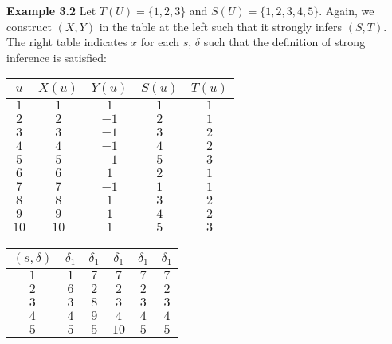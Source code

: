 \documentclass[11pt]{article}
\begin{document}
  
 \bigbreak
 \bigbreak 
 \textbf{Example 3.2} \quad Let $ T(U) = \{1, 2, 3\} $ and $ S(U) = \{1, 2, 3, 4, 5\} $. Again, we construct $ (X, Y) $ in the table at the left such that it strongly infers $ (S, T) $. The right table indicates $ x $ for each $ s $, $ \delta $ such that the definition of strong inference is satisfied: \\ 

 \begin{center}
 \begin{tabular}{ c||c|c|c|c } 

 $ u $ & $ X(u) $ & $ Y(u) $ & $ S(u) $ & $ T(u) $ \\ 
 \hline
 \hline
 $ 1 $ & $ 1 $ & $ 1 $ & $ 1 $ & $ 1 $ \\
 \hline
 $ 2 $ & $ 2 $ & $ -1 $ & $ 2 $ & $ 1 $ \\
 \hline
 $ 3 $ & $ 3 $ & $ -1 $ & $ 3 $ & $ 2 $ \\
 \hline
 $ 4 $ & $ 4 $ & $ -1 $ & $ 4 $ & $ 2 $ \\
 \hline
 $ 5 $ & $ 5 $ & $ -1 $ & $ 5 $ & $ 3 $ \\
 \hline
 $ 6 $ & $ 6 $ & $ 1 $ & $ 2 $ & $ 1 $ \\
 \hline
 $ 7 $ & $ 7 $ & $ -1 $ & $ 1 $ & $ 1 $ \\
 \hline
 $ 8 $ & $ 8 $ & $ 1 $ & $ 3 $ & $ 2 $ \\
 \hline
 $ 9 $ & $ 9 $ & $ 1 $ & $ 4 $ & $ 2 $ \\
 \hline
 $ 10 $ & $ 10 $ & $ 1 $ & $ 5 $ & $ 3 $ \\ 
 \end{tabular} 
 \quad
 \begin{tabular}{ c||c|c|c|c|c } 

 $ (s, \delta) $ & $ \delta_1 $ & $ \delta_1 $ & $ \delta_1 $ & $ \delta_1 $ & $ \delta_1 $ \\ 
 \hline
 \hline
 $ 1 $ & $ 1 $ & $ 7 $ & $ 7 $ & $ 7 $ & $ 7 $ \\
 \hline
 $ 2 $ & $ 6 $ & $ 2 $ & $ 2 $ & $ 2 $ & $ 2 $ \\
 \hline
 $ 3 $ & $ 3 $ & $ 8 $ & $ 3 $ & $ 3 $ & $ 3 $ \\
 \hline
 $ 4 $ & $ 4 $ & $ 9 $ & $ 4 $ & $ 4 $ & $ 4 $ \\
 \hline 
 $ 5 $ & $ 5 $ & $ 5 $ & $ 10 $ & $ 5 $ & $ 5 $ \\
 
 \end{tabular}
 \end{center} 
 
\end{document}

